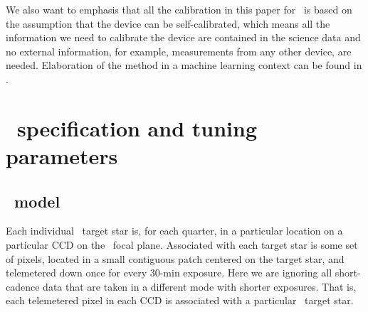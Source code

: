 We also want to emphasis that all the calibration in this paper for \Kepler\ is based on the assumption that the device can be self-calibrated, which means all the information we need to calibrate the device are contained in the science data and no external information, 
  for example, measurements from any other device, are needed.
Elaboration of the method in a machine learning context can be found in \citealt{icml2015}.

\section{\name\ specification and tuning parameters}
\subsection{\name\ model}
Each individual \Kepler\ target star is, for each quarter, in a particular location on a particular CCD on the \Kepler\ focal plane.
Associated with each target star is some set of pixels, located in a small contiguous patch centered on the target star, and telemetered down once for every 30-min exposure.
Here we are ignoring all short-cadence data that are taken in a different mode with shorter exposures.
That is, each telemetered pixel in each CCD is associated with a particular \Kepler\ target star.

